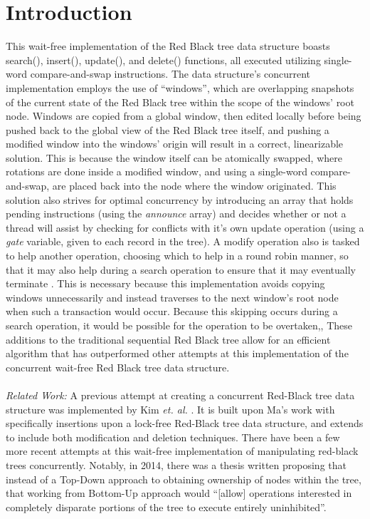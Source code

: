 \documentclass[letterpaper, 10 pt, conference]{ieeeconf}
\begin{document}
	\section{Introduction}
	This wait-free implementation of the Red Black tree data structure boasts search(), insert(), update(), and delete() functions, all executed utilizing single-word compare-and-swap instructions. The data structure's concurrent implementation employs the use of ``windows'', which are overlapping snapshots of the current state of the Red Black tree within the scope of the windows' root node. Windows are copied from a global window, then edited locally before being pushed back to the global view of the Red Black tree itself, and pushing a modified window into the windows' origin will result in a correct, linearizable solution. This is because the window itself can be atomically swapped, where rotations are done inside a modified window, and using a single-word compare-and-swap, are placed back into the node where the window originated. This solution also strives for optimal concurrency by introducing an array that holds pending instructions (using the \textit{announce} array) and decides whether or not a thread will assist by checking for conflicts with it's own update operation (using a \textit{gate} variable, given to each record in the tree). A modify operation also is tasked to help another operation, choosing which to help in a round robin manner, so that it may also help during a search operation to ensure that it may eventually terminate \cite{c1}. This is necessary because this implementation avoids copying windows unnecessarily and instead traverses to the next window's root node when such a transaction would occur. Because this skipping occurs during a search operation, it would be possible for the operation to be overtaken,,  These additions to the traditional sequential Red Black tree allow for an efficient algorithm that has outperformed other attempts at this implementation of the concurrent wait-free Red Black tree data structure. \\ \\
	
	\textit{Related Work: }A previous attempt at creating a concurrent Red-Black tree data structure was implemented by Kim \textit{et. al.} \cite{c3}. It is built upon Ma's \cite{c4} work with specifically insertions upon a lock-free Red-Black tree data structure, and \cite{c3} extends \cite{c4} to include both modification and deletion techniques. There have been a few more recent attempts at this wait-free implementation of manipulating red-black trees concurrently. Notably, in 2014, there was a thesis written proposing that instead of a Top-Down approach to obtaining ownership of nodes within the tree, that working from Bottom-Up approach would ``[allow] operations interested in completely disparate portions of the tree to execute entirely uninhibited''\cite{c2}. \\ \\
	
\end{document}
